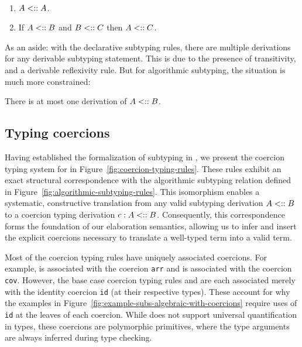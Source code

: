 \documentclass[runningheads]{llncs}
\begin{document}
\begin{lemma}
  \

  \begin{enumerate}
\item  $A \mathrel{<::} A$.
\item  If $A \mathrel{<::} B$ and $B \mathrel{<::} C$ then $A \mathrel{<::} C$.
  \end{enumerate}
  \end{lemma}

\noindent As an aside: with the declarative subtyping rules, there are
multiple derivations for any derivable subtyping statement.  This is
due to the presence of transitivity, and a derivable reflexivity rule.
But for algorithmic subtyping, the situation is much more constrained:

\begin{theorem}[Uniqueness]
  \label{thm:uniqueness}
  There is at most one derivation of $A \mathrel{<::} B$.
\end{theorem}

\subsection{Typing coercions}
\label{sec:typing-coercions}

Having established the formalization of subtyping in \lcataSub, we present the coercion typing system for \lcata in Figure~\ref{fig:coercion-typing-rules}.
These rules exhibit an exact structural correspondence with the algorithmic subtyping relation defined in Figure~\ref{fig:algorithmic-subtyping-rules}.
This isomorphism enables a systematic, constructive translation from any valid subtyping derivation $A \mathrel{<::} B$ to a coercion typing derivation $c : A \mathrel{<::} B$.
Consequently, this correspondence forms the foundation of our elaboration semantics, allowing us to infer and insert the explicit coercions necessary to translate a well-typed \lcataSub term into a valid \lcata term.

Most of the coercion typing rules have uniquely associated coercions.
For example,  is associated with the coercion \verb|arr| and  is associated with the coercion \verb|cov|.
However, the base case coercion typing rules  and  are each associated merely with the identity coercion \verb|id| (at their respective types).
These account for why the examples in Figure~\ref{fig:example-subs-algebraic-with-coercions} require uses of \verb|id| at the leaves of each coercion.
While \lcata does not support universal quantification in types, these coercions are polymorphic primitives, where the type arguments are always inferred during type checking.
\end{document}
